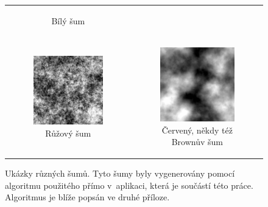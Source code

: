 \begin{figure}[h!]
\begin{tabular}{cc}
\begin{subfigure}{0.45\textwidth}
  \caption{Bílý šum} 
\end{subfigure}\\
\begin{subfigure}{0.45\textwidth}
  \centering
  \includegraphics[width=.8\linewidth]{img/pink_noise}
  \caption{Růžový šum} 
\end{subfigure}&
\begin{subfigure}{0.45\textwidth}
  \centering
  \includegraphics[width=.8\linewidth]{img/brown_noise}
  \caption{Červený, někdy též Brownův šum} 
\end{subfigure}%
\end{tabular} 
\caption{Ukázky různých šumů. Tyto šumy byly vygenerovány pomocí algoritmu použitého přímo v~aplikaci, která je součástí této práce. Algoritmus je blíže popsán ve druhé příloze.} 
\label{obr:noise:example} 
 
\end{figure}
